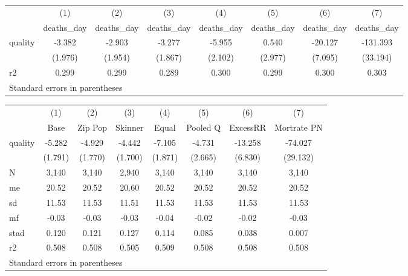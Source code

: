 \begin{tabular}{l*{7}{c}}
\hline\hline
            &\multicolumn{1}{c}{(1)}&\multicolumn{1}{c}{(2)}&\multicolumn{1}{c}{(3)}&\multicolumn{1}{c}{(4)}&\multicolumn{1}{c}{(5)}&\multicolumn{1}{c}{(6)}&\multicolumn{1}{c}{(7)}\\
            &\multicolumn{1}{c}{deaths\_day}&\multicolumn{1}{c}{deaths\_day}&\multicolumn{1}{c}{deaths\_day}&\multicolumn{1}{c}{deaths\_day}&\multicolumn{1}{c}{deaths\_day}&\multicolumn{1}{c}{deaths\_day}&\multicolumn{1}{c}{deaths\_day}\\
\hline
quality     &      -3.382&      -2.903&      -3.277&      -5.955&       0.540&     -20.127&    -131.393\\
            &     (1.976)&     (1.954)&     (1.867)&     (2.102)&     (2.977)&     (7.095)&    (33.194)\\
\hline
r2          &       0.299&       0.299&       0.289&       0.300&       0.299&       0.300&       0.303\\
\hline\hline
\multicolumn{8}{l}{\footnotesize Standard errors in parentheses}\\
\end{tabular}
\begin{tabular}{l*{7}{c}}
\hline\hline
            &\multicolumn{1}{c}{(1)}&\multicolumn{1}{c}{(2)}&\multicolumn{1}{c}{(3)}&\multicolumn{1}{c}{(4)}&\multicolumn{1}{c}{(5)}&\multicolumn{1}{c}{(6)}&\multicolumn{1}{c}{(7)}\\
            &\multicolumn{1}{c}{Base}&\multicolumn{1}{c}{Zip Pop}&\multicolumn{1}{c}{Skinner}&\multicolumn{1}{c}{Equal}&\multicolumn{1}{c}{Pooled Q}&\multicolumn{1}{c}{ExcessRR}&\multicolumn{1}{c}{Mortrate PN}\\
\hline
quality     &      -5.282&      -4.929&      -4.442&      -7.105&      -4.731&     -13.258&     -74.027\\
            &     (1.791)&     (1.770)&     (1.700)&     (1.871)&     (2.665)&     (6.830)&    (29.132)\\
\hline
N           &       3,140&       3,140&       2,940&       3,140&       3,140&       3,140&       3,140\\
me          &       20.52&       20.52&       20.60&       20.52&       20.52&       20.52&       20.52\\
sd          &       11.53&       11.53&       11.51&       11.53&       11.53&       11.53&       11.53\\
mf          &       -0.03&       -0.03&       -0.03&       -0.04&       -0.02&       -0.02&       -0.03\\
stad        &       0.120&       0.121&       0.127&       0.114&       0.085&       0.038&       0.007\\
r2          &       0.508&       0.508&       0.505&       0.509&       0.508&       0.508&       0.508\\
\hline\hline
\multicolumn{8}{l}{\footnotesize Standard errors in parentheses}\\
\end{tabular}
